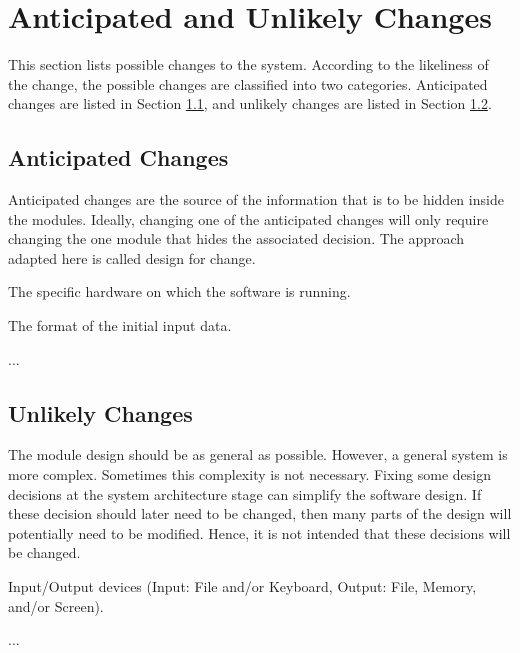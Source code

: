 \documentclass[12pt, titlepage]{article}
\newcounter{acnum}
\newcommand{\actheacnum}{AC\theacnum}
\newcounter{ucnum}
\newcommand{\uctheucnum}{UC\theucnum}
\begin{document}
\section{Anticipated and Unlikely Changes} \label{SecChange}

This section lists possible changes to the system. According to the likeliness of the change, the
possible changes are classified into two categories. Anticipated changes are listed in Section
\ref{SecAchange}, and unlikely changes are listed in Section \ref{SecUchange}.

\subsection{Anticipated Changes} \label{SecAchange}

Anticipated changes are the source of the information that is to be hidden inside the modules.
Ideally, changing one of the anticipated changes will only require changing the one module that
hides the associated decision. The approach adapted here is called design for change.

\begin{description}
	\item[ \actheacnum \label{acHardware}:] The specific
		hardware on which the software is running.
	\item[ \actheacnum \label{acInput}:] The format of the
		initial input data.
	\item ...
\end{description}

\subsection{Unlikely Changes} \label{SecUchange}

The module design should be as general as possible. However, a general system is more complex.
Sometimes this complexity is not necessary. Fixing some design decisions at the system architecture
stage can simplify the software design. If these decision should later need to be changed, then
many parts of the design will potentially need to be modified. Hence, it is not intended that these
decisions will be changed.

\begin{description}
	\item[ \uctheucnum \label{ucIO}:] Input/Output devices
		(Input: File and/or Keyboard, Output: File, Memory, and/or Screen).
	\item ...
\end{description}
\end{document}
